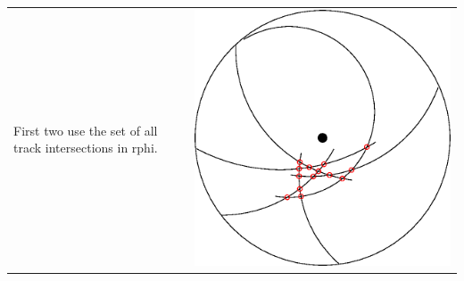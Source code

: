 \begin{slide*}

\slideframe{}
\huge
{}

\begin{minipage}[t]{\linewidth}
\LARGE

\begin{tabular}{l c r}
  \begin{minipage}{3.5 in}
    \huge
    First two use the set of all track intersections in rphi.
  \end{minipage}
  & \hspace{0.5 in} & 
  \begin{minipage}{1 in}
    \includegraphics[width=\linewidth]{crossings_2d.eps}
  \end{minipage}
\end{tabular}

\vspace{0.5 cm}


\end{minipage}
\end{slide*}
